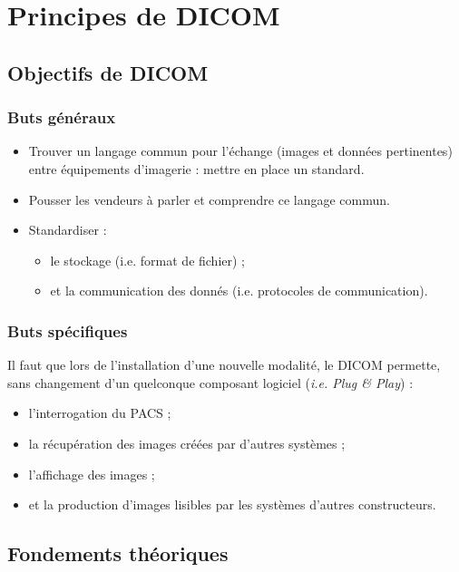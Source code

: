 \section{Principes de DICOM}

	\subsection{Objectifs de DICOM}
	
	\frame
	{
		\frametitle{Buts g\'en\'eraux}
		\begin{itemize}
			\item<1-> Trouver un langage commun pour l'\'echange (images et donn\'ees pertinentes) entre \'equipements d'imagerie : mettre en place un standard.
			\item<2-> Pousser les vendeurs \`a parler et comprendre ce langage commun.
			\item<3-> Standardiser :
			\begin{itemize}
				\item<4-> le stockage (i.e. format de fichier) ;
				\item<5-> et la communication des donn\'es (i.e. protocoles de communication).
			\end{itemize}
		\end{itemize}
	}
	
	\frame
	{
		\frametitle{Buts sp\'ecifiques}
		
        Il faut que lors de l'installation d'une nouvelle modalit\'e, le DICOM permette, sans changement d'un quelconque composant logiciel (\emph{i.e. Plug \& Play}) :
		\begin{itemize}
			\item<1-> l'interrogation du PACS ;
			\item<2-> la r\'ecup\'eration des images cr\'e\'ees par d'autres syst\`emes ;
			\item<3-> l'affichage des images ;
			\item<4-> et la production d'images lisibles par les syst\`emes d'autres constructeurs.
		\end{itemize}
	}

	\subsection{Fondements th\'eoriques}

